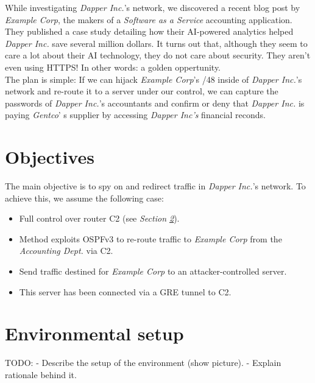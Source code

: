 \documentclass[11pt,a4paper,oneside]{article}
\newcommand{\lsection}[2]{\section{#1}\label{sec:#2}}
\begin{document}
    While investigating \textit{Dapper Inc.}'s network, we discovered a recent blog post by \textit{Example Corp}, the makers of a \textit{Software as a Service} accounting application. They published a case study detailing how their AI-powered analytics helped \textit{Dapper Inc.} save several million dollars. It turns out that, although they seem to care a lot about their AI technology, they do not care about security. They aren't even using HTTPS! In other words: a golden oppertunity.\\
    The plan is simple: If we can hijack \textit{Example Corp}'s /48 inside of \textit{Dapper Inc.}'s network and re-route it to a server under our control, we can capture the passwords of \textit{Dapper Inc.}'s accountants and confirm or deny that \textit{Dapper Inc.} is paying \textit{Gentco}' s supplier by accessing \textit{Dapper Inc's} financial reconds.


    \lsection{Objectives}{objectives}
    The main objective is to spy on and redirect traffic in \textit{Dapper Inc.}'s network. To achieve this, we assume the following case:
    \begin{itemize}
        \item Full control over router C2 (see \textit{Section \ref{sec:env_setup}}).
        \item Method exploits OSPFv3 to re-route traffic to \textit{Example Corp} from the \textit{Accounting Dept.} via C2.
        \item Send traffic destined for \textit{Example Corp} to an attacker-controlled server.
        \item This server has been connected via a GRE tunnel to C2.
    \end{itemize}


    \lsection{Environmental setup}{env_setup}
    TODO:
    - Describe the setup of the environment (show picture).
    - Explain rationale behind it.
\end{document}
